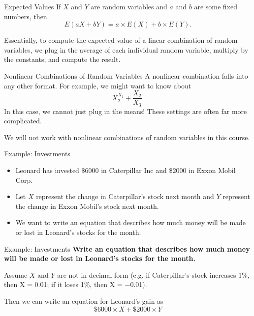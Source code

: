 \begin{frame}{Expected Values}
    If $X$ and $Y$ are random variables and $a$ and $b$ are some fixed numbers, then
    \[
        E(aX + bY) = a×E(X)+b×E(Y).
    \]
    
    \vspace{12pt}Essentially, to compute the expected value of a linear combination of random variables, we plug in the average of each individual random variable, multiply by the constants, and compute the result.
\end{frame}

\begin{frame}{Nonlinear Combinations of Random Variables}
    A nonlinear combination falls into any other format. For example, we might want to know about
    \[
        X_2^{X_1} + \frac{X_2}{X_3}.
    \]
    In this case, we cannot just plug in the means! These settings are often far more complicated. 
    
    \vspace{12pt}We will not work with nonlinear combinations of random variables in this course.
\end{frame}

\begin{frame}{Example: Investments}
    \begin{itemize}
        \item Leonard has invested \$6000 in Caterpillar Inc and \$2000 in Exxon Mobil Corp.
        \item Let $X$ represent the change in Caterpillar’s stock next month and $Y$ represent the change in Exxon Mobil’s stock next month.
        \item We want to write an equation that describes how much money will be made or lost in Leonard’s stocks for the month.
    \end{itemize}
\end{frame}

\begin{frame}{Example: Investments}
    \textbf{Write an equation that describes how much money will be made or lost in Leonard’s stocks for the month.}
    
    \vspace{12pt}Assume $X$ and $Y$ are not in decimal form (e.g. if Caterpillar’s stock increases 1\%, then X = 0.01; if it loses 1\%, then X = −0.01). 
    
    \vspace{12pt}Then we can write an equation for Leonard’s gain as
    \[
        \$6000\times X + \$2000\times Y
    \]
\end{frame}

